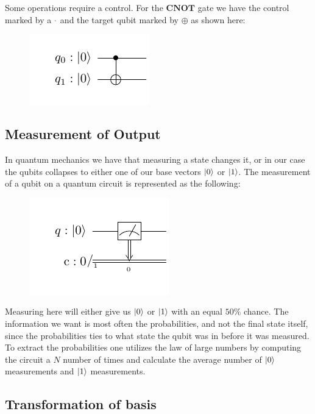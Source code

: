 Some operations require a control. For the $\textbf{CNOT}$ gate we have the control marked by a $\Huge{\cdot}$ and the target qubit marked by $\oplus$ as shown here:

\begin{figure}[H]
    \centering
    \includegraphics{Figures/Circuits/Theory/cxbasecircuit.pdf}
\end{figure}


\subsection{Measurement of Output}

In quantum mechanics we have that measuring a state changes it, or in our case the qubits collapses to either one of our base vectors $\ket{0}$ or $\ket{1}$. The measurement of a qubit on a quantum circuit is represented as the following:

\begin{figure}[H]
    \centering
    \includegraphics{Figures/Circuits/Theory/measurebasecircuit.pdf}
\end{figure}


Measuring here will either give us $\ket{0}$ or $\ket{1}$ with an equal $50\%$ chance. The information we want is most often the probabilities, and not the final state itself, since the probabilities ties to what state the qubit was in before it was measured. To extract the probabilities one utilizes the law of large numbers by computing the circuit a $N$ number of times and calculate the average number of $\ket{0}$ measurements and $\ket{1}$ measurements.

\subsection{Transformation of basis}

